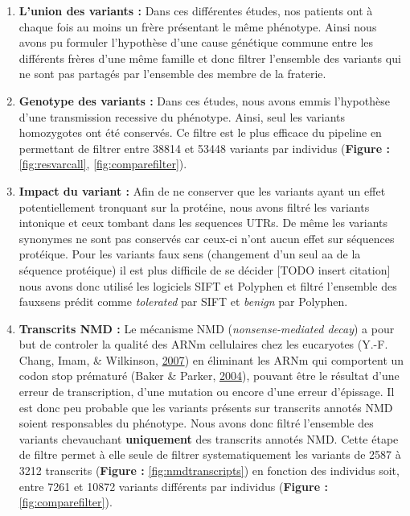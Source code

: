 \documentclass[12pt,twoside]{reedthesis}
\providecommand{\tightlist}{%
  \setlength{\itemsep}{0pt}\setlength{\parskip}{0pt}}
\theoremstyle{definition}
\theoremstyle{definition}
\theoremstyle{remark}
\begin{document}
  \begin{enumerate}
  \def\labelenumi{\arabic{enumi}.}
  \tightlist
  \item
    \textbf{L'union des variants :} Dans ces différentes études, nos
    patients ont à chaque fois au moins un frère présentant le même
    phénotype. Ainsi nous avons pu formuler l'hypothèse d'une cause
    génétique commune entre les différents frères d'une même famille et
    donc filtrer l'ensemble des variants qui ne sont pas partagés par
    l'ensemble des membre de la fraterie.\\
  \item
    \textbf{Genotype des variants :} Dans ces études, nous avons emmis
    l'hypothèse d'une transmission recessive du phénotype. Ainsi, seul les
    variants homozygotes ont été conservés. Ce filtre est le plus efficace
    du pipeline en permettant de filtrer entre 38814 et 53448 variants par
    individus (\textbf{Figure : }\ref{fig:resvarcall},
    \ref{fig:comparefilter}).\\
  \item
    \textbf{Impact du variant :} Afin de ne conserver que les variants
    ayant un effet potentiellement tronquant sur la protéine, nous avons
    filtré les variants intonique et ceux tombant dans les sequences UTRs.
    De même les variants synonymes ne sont pas conservés car ceux-ci n'ont
    aucun effet sur séquences protéique. Pour les variants faux sens
    (changement d'un seul aa de la séquence protéique) il est plus
    difficile de se décider {[}TODO insert citation{]} nous avons donc
    utilisé les logiciels SIFT et Polyphen et filtré l'ensemble des
    fauxsens prédit comme \emph{tolerated} par SIFT et \emph{benign} par
    Polyphen.\\
  \item
    \textbf{Transcrits NMD :} Le mécanisme NMD (\emph{nonsense-mediated
    decay}) a pour but de controler la qualité des ARNm cellulaires chez
    les eucaryotes (Y.-F. Chang, Imam, \& Wilkinson,
    \protect\hyperlink{ref-Chang2007}{2007}) en éliminant les ARNm qui
    comportent un codon stop prématuré (Baker \& Parker,
    \protect\hyperlink{ref-Baker2004}{2004}), pouvant être le résultat
    d'une erreur de transcription, d'une mutation ou encore d'une erreur
    d'épissage. Il est donc peu probable que les variants présents sur
    transcrits annotés NMD soient responsables du phénotype. Nous avons
    donc filtré l'ensemble des variants chevauchant \textbf{uniquement}
    des transcrits annotés NMD. Cette étape de filtre permet à elle seule
    de filtrer systematiquement les variants de 2587 à 3212 transcrits
    (\textbf{Figure : }\ref{fig:nmdtranscripts}) en fonction des individus
    soit, entre 7261 et 10872 variants différents par individus
    (\textbf{Figure : }\ref{fig:comparefilter}).
  \end{enumerate}
  
\end{document}
